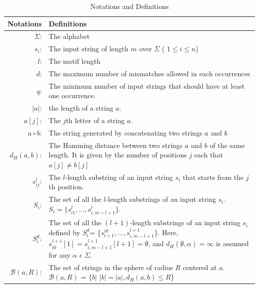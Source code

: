 \begin{table}
	\begin{center}
		\caption{Notations and Definitions}
		\label{notations_and_def}
		\begin{tabular}{|r|p{280 pt}|}
			\hline
			Notations & Definitions \\
			\hline
			$ \Sigma $: & The alphabet \\			
			$s_{i}$: 
			&  The input string of length $m$ over $\Sigma$ ( $1 \leq i \leq n $)\\
			$l$:
			& The motif length\\
			$d$:
			&  The maximum number of mismatches allowed in each occurrences\\
			$q$:
			& The minimum number of input strings that should have at least one occurrence.\\
			$|a|$:
			& the length of a string $a$.\\
			$a[j]$:
			&  The $j$th letter of a string $a$.\\
			$a\circ b$:
			& The string generated by concatenating two strings $a$ and $b$\\
			$d_{H}(a,b)$:
			& The Hamming distance between two strings $a$ and $b$ of the same length. It is given by the number of positions $j$ such that $a[j] \ne b[j]$\\
			$s_{ij}^{l}$:
			& The $l$-length substring of an input string $s_{i}$ that starts from the $j$th position.\\
			
			$S_{i}$: 			
			& The set of all the $l$-length substrings of an input string
			$s_{i}$. $S_{i}=\{s_{i1}^{l},...,s_{i,m−l+1}^{l}\}$.
			\\
			$S_{i}^{d}$:
			
			& The set of all the $(l+1)$-length substrings of an input string $s_{i}$ defined by $S_{i}^{d}$= \{$s_{l+1}^{i0},...,s_{i,m−l+1}^{l+1}$\}. Here, $s_{i0}^{l+1}[1] = s_{i,m-l+1}^{l+1}[l+1] = \emptyset$, and $d_{H}(\emptyset, \alpha) = \infty$ is assumed for any $\alpha$ $\epsilon$ $\Sigma$.
			\\
			$\mathcal{B}(a, R)$:
			& The set of strings in the sphere of radius $R$ centered at $a$. $\mathcal{B}(a,R)$ = $\{b$$\vert$ $\lvert b\rvert = |a|, d_{H}(a,b)\leq R$\}
			

\end{tabular}
\end{center}
\end{table}
